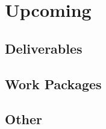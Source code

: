 \chapter{Upcoming}
\label{chapter:upcoming}

\section{Deliverables}

\section{Work Packages}

\section{Other}

